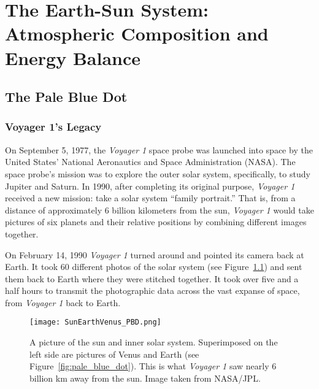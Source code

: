 
\chapter[Earth-Sun System]{The Earth-Sun System: Atmospheric Composition and Energy Balance}\label{ch:earth_sun} 

\section{\label{sec:pbd}The Pale Blue Dot}

\subsection{Voyager 1's Legacy}

On September 5, 1977, the \emph{Voyager 1} space probe was launched into space by the United States' National Aeronautics and Space Administration (NASA). The space probe's mission was to explore the outer solar system, specifically, to study Jupiter and Saturn. In 1990, after completing its original purpose,  \emph{Voyager 1} received a new mission: take a solar system ``family portrait.'' That is, from a distance of approximately 6 billion kilometers from the sun, \emph{Voyager 1} would take pictures of six planets and their relative positions by combining different images together.

On February 14, 1990  \emph{Voyager 1} turned around and pointed its camera back at Earth. It took 60 different photos of the solar system (see Figure~\ref{fig:EarthSunVenus}) and sent them back to Earth where they were stitched together. It took over five and a half hours to transmit the photographic data across the vast expanse of space, from \emph{Voyager 1} back to Earth. 

    \begin{figure}[ht]
    \centering
		\texttt{[image: SunEarthVenus\_PBD.png]}
		\caption{A picture of the sun and inner solar system. Superimposed on the left side are pictures of Venus and Earth (see Figure~\ref{fig:pale_blue_dot}). This is what \emph{Voyager 1} saw nearly 6 billion \si{\km} away from the sun. Image taken from NASA/JPL.}
        \label{fig:EarthSunVenus}
    \end{figure}


